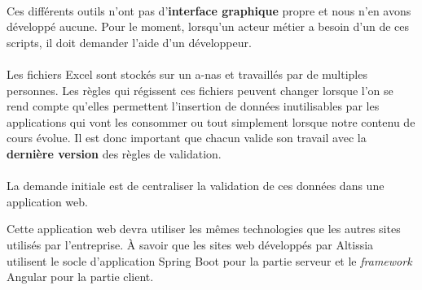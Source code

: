 \paragraph{}
Ces différents outils n'ont pas d'\textbf{interface graphique} propre et nous n'en avons développé aucune.
Pour le moment, lorsqu'un acteur métier a besoin d'un de ces scripts, il doit demander l'aide d'un développeur.

\paragraph{}
Les fichiers Excel sont stockés sur un \gls{a-nas} et travaillés par de multiples personnes.
Les règles qui régissent ces fichiers peuvent changer lorsque l'on se rend compte qu'elles permettent l'insertion de données inutilisables par les applications qui vont les consommer ou tout simplement lorsque notre contenu de cours évolue.
Il est donc important que chacun valide son travail avec la \textbf{dernière version} des règles de validation.

\paragraph{}
La demande initiale est de centraliser la validation de ces données dans une application web.

Cette application web devra utiliser les mêmes technologies que les autres sites utilisés par l'entreprise. À savoir que les sites web développés par Altissia utilisent le socle d'application Spring Boot pour la partie serveur et le \textit{framework} Angular pour la partie client\fnmark{}.

